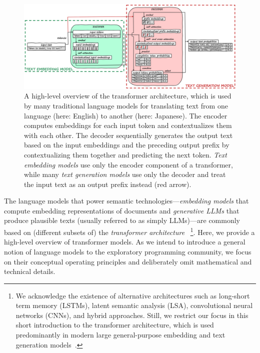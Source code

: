 \begin{figure}[Z]
	\centering
	\includegraphics[width=\linewidth]{04_semtec/transformer.png}
	\caption[A high-level overview of the \emph{transformer architecture} for large language models that embed and generate text.]{
		A high-level overview of the transformer architecture, which is used by many traditional language models for translating text from one language (here: English) to another (here: Japanese).
		The encoder computes embeddings for each input token and contextualizes them with each other.
		The decoder sequentially generates the output text based on the input embeddings and the preceding output prefix by contextualizing them together and predicting the next token.
		\emph{Text embedding models} use only the encoder component of a transformer, while many \emph{text generation models} use only the decoder and treat the input text as an output prefix instead (\textcolor[HTML]{c00000}{red} arrow).
	}
	\label{fig:background/semtec/transformer}
\end{figure}

The language models that power semantic technologies---\emph{embedding models} that compute embedding representations of documents and \emph{generative LLMs} that produce plausible texts (usually referred to as simply LLMs)---are commonly based on (different subsets of) the \emph{transformer architecture}~\cite{vaswani2017attention}%
\footnote{
	We acknowledge the existence of alternative architectures such as long-short term memory (LSTMs), latent semantic analysis (LSA), convolutional neural networks (CNNs), and hybrid approaches.
	Still, we restrict our focus in this short introduction to the transformer architecture, which is used predominantly in modern large general-purpose embedding and text generation models~\cite{oralkbekova2023contemporary}.
}.
Here, we provide a high-level overview of transformer models.
As we intend to introduce a general notion of language models to the exploratory programming community, we focus on their conceptual operating principles and deliberately omit mathematical and technical details.

